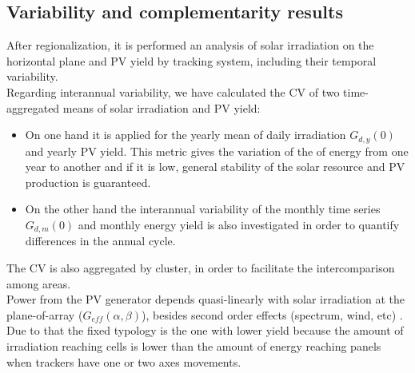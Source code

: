 \subsection{Variability and complementarity results}

After regionalization, it is performed an analysis of solar irradiation on the horizontal plane and PV yield by tracking system, including their temporal variability.\\

Regarding interannual variability, we have calculated the CV of two time-aggregated means of solar irradiation and PV yield:

\begin{itemize}
\item On one hand it is applied for the yearly mean of daily irradiation $G_{d,y}(0)$ and yearly PV yield. This metric gives the variation of the of energy from one year to another and if it is low, general stability of the solar resource and PV production is guaranteed. 
\item On the other hand the interannual variability of the monthly time series $G_{d,m}(0)$ and monthly energy yield is also investigated in order to quantify differences in the annual cycle. 
\end{itemize}

The CV is also aggregated by cluster, in order to facilitate the intercomparison among areas.\\


Power from the PV generator depends quasi-linearly with solar irradiation at the plane-of-array ($G_{eff}(\alpha,\beta)$), besides second order effects (spectrum, wind, etc) \cite*{Perpinan2007} . Due to that the fixed typology is the one with lower yield because the amount of irradiation reaching cells is lower than the amount of energy reaching panels when trackers have one or two axes movements.


